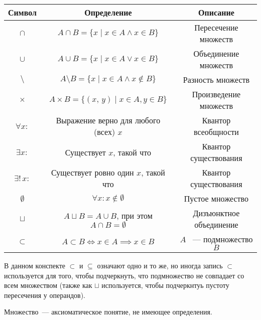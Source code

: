 
\begin{center}
  \renewcommand{\arraystretch}{1.7}
  \large
  \begin{tabular}{| c | c | c |}
    \hline
    \textbf{Символ} & \textbf{Определение} & \textbf{Описание}\\
    \hline
    {\Large $\cap$} & $A \cap B = \{ x \mid x \in A \land x \in B\}$ & Пересечение множеств\\
    \hline
    {\Large $\cup$} & $A \cup B = \{ x \mid x \in A \lor x \in B\}$ & Объединение множеств\\
    \hline
    {\Large $\setminus$} & $A \setminus B = \{ x \mid x \in A \land x \notin B\}$ & Разность множеств\\
    \hline
    {\Large $\times$} & $A \times B = \{ (x,\,y) \mid x \in A, y \in B\}$ & Произведение множеств\\
    \hline
    {\Large $\forall x\colon$} & Выражение верно для любого (всех) $x$ & Квантор всеобщности\\
    \hline
    {\Large $\exists x\colon$} & Существует $x$, такой что & Квантор существования\\
    \hline
    {\Large $\exists!\, x\colon$} & Существует ровно один $x$, такой что & Квантор существования\\
    \hline
    {\Large $\emptyset$} & $\forall x\colon x \notin \emptyset$ & Пустое множество\\
    \hline
    {\Large $\sqcup$} & $A \sqcup B = A \cup B$, при этом $A \cap B = \emptyset$ & Дизъюнктное объединение\\
    \hline
    {\Large $\subset$} & $A \subset B \iff x \in A\implies x\in B$ & $A$ ~--- подмножество $B$\\
    \hline
  \end{tabular}
\end{center}
\bigskip
\begin{remark}
  В данном конспекте $\subset$ и $\subseteq$ означают одно и то же, но иногда запись $\subset$ используется для того, чтобы подчеркнуть, что подмножество не совпадает со всем множеством (также как $\sqcup$ используется, чтобы подчеркнтуь пустоту пересечения у операндов).
\end{remark}

\begin{definition}\label{def:intro-set}
  Множество~--- аксиоматическое понятие, не имеющее определения.
\end{definition}

